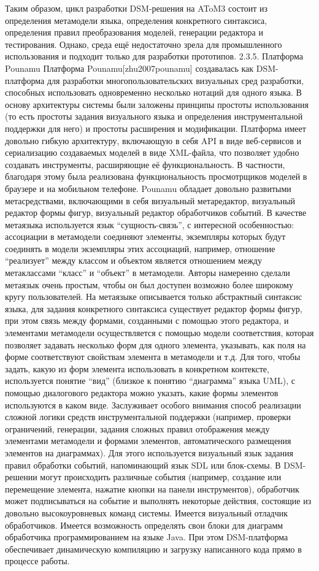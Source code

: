 	Таким образом, цикл разработки DSM-решения на AToM3 состоит из определения метамодели языка, определения конкретного синтаксиса, определения правил преобразования моделей, генерации редактора и тестирования. Однако, среда ещё недостаточно зрела для промышленного использования и подходит только для разработки прототипов.
2.3.5. Платформа Pounamu
	Платформа Pounamu[zhu2007pounamu] создавалась как DSM-платформа для разработки многопользовательских визуальных сред разработки, способных использовать одновременно несколько нотаций для одного языка. В основу архитектуры системы были заложены принципы простоты использования (то есть простоты задания визуального языка и определения инструментальной поддержки для него) и простоты расширения и модификации. Платформа имеет довольно гибкую архитектуру, включающую в себя API в виде веб-сервисов и сериализацию создаваемых моделей в виде XML-файла, что позволяет удобно создавать инструменты, расширяющие её функциональность. В частности, благодаря этому была реализована функциональность просмотрщиков моделей в браузере и на мобильном телефоне.
	Pounamu обладает довольно развитыми метасредствами, включающими в себя визуальный метаредактор, визуальный редактор формы фигур, визуальный редактор обработчиков событий. В качестве метаязыка используется язык “сущность-связь”, с интересной особенностью: ассоциации в метамодели соединяют элементы, экземпляры которых будут соединять в модели экземпляры этих ассоциаций, например, отношение “реализует” между классом и объектом является отношением между метаклассами “класс” и “объект” в метамодели. Авторы намеренно сделали метаязык очень простым, чтобы он был доступен возможно более широкому кругу пользователей. На метаязыке описывается только абстрактный синтаксис языка, для задания конкретного синтаксиса существует редактор формы фигур, при этом связь между формами, созданными с помощью этого редактора, и элементами метамодели осуществляется с помощью модели соответствия, которая позволяет задавать несколько форм для одного элемента, указывать, как поля на форме соответствуют свойствам элемента в метамодели и т.д. Для того, чтобы задать, какую из форм элемента использовать в конкретном контексте, используется понятие “вид” (близкое к понятию “диаграмма” языка UML), с помощью диалогового редактора можно указать, какие формы элементов используются в каком виде.
	Заслуживает особого внимания способ реализации сложной логики средств инструментальной поддержки (например, проверки ограничений, генерации, задания сложных правил отображения между элементами метамодели и формами элементов, автоматического размещения элементов на диаграммах). Для этого используется визуальный язык задания правил обработки событий, напоминающий язык SDL или блок-схемы. В DSM-решении могут происходить различные события (например, создание или перемещение элемента, нажатие кнопки на панели инструментов), обработчик может подписываться на событие и выполнять некоторые действия, состоящие из довольно высокоуровневых команд системы. Имеется визуальный отладчик обработчиков. Имеется возможность определять свои блоки для диаграмм обработчика программированием на языке Java. При этом DSM-платформа обеспечивает динамическую компиляцию и загрузку написанного кода прямо в процессе работы.
